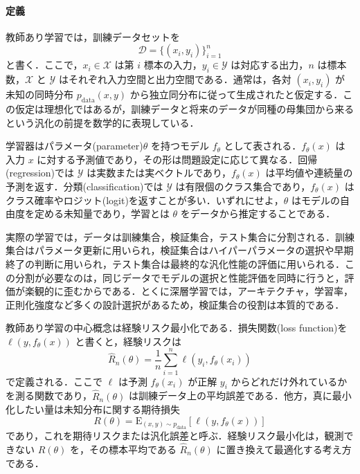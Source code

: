 \paragraph*{定義}
教師あり学習では，訓練データセットを
\begin{equation}
\mathcal D = \{(x_i,y_i)\}_{i=1}^n
\end{equation}
と書く．ここで，$x_i \in \mathcal X$ は第 $i$ 標本の入力，$y_i \in \mathcal Y$ は対応する出力，$n$ は標本数，$\mathcal X$ と $\mathcal Y$ はそれぞれ入力空間と出力空間である．通常は，各対 $(x_i,y_i)$ が未知の同時分布 $p_{\mathrm{data}}(x,y)$ から独立同分布に従って生成されたと仮定する．この仮定は理想化ではあるが，訓練データと将来のデータが同種の母集団から来るという汎化の前提を数学的に表現している．

学習器はパラメータ(parameter)$\theta$ を持つモデル $f_\theta$ として表される．$f_\theta(x)$ は入力 $x$ に対する予測値であり，その形は問題設定に応じて異なる．回帰(regression)では $\mathcal Y$ は実数または実ベクトルであり，$f_\theta(x)$ は平均値や連続量の予測を返す．分類(classification)では $\mathcal Y$ は有限個のクラス集合であり，$f_\theta(x)$ はクラス確率やロジット(logit)を返すことが多い．いずれにせよ，$\theta$ はモデルの自由度を定める未知量であり，学習とは $\theta$ をデータから推定することである．

実際の学習では，データは訓練集合，検証集合，テスト集合に分割される．訓練集合はパラメータ更新に用いられ，検証集合はハイパーパラメータの選択や早期終了の判断に用いられ，テスト集合は最終的な汎化性能の評価に用いられる．この分割が必要なのは，同じデータでモデルの選択と性能評価を同時に行うと，評価が楽観的に歪むからである．とくに深層学習では，アーキテクチャ，学習率，正則化強度など多くの設計選択があるため，検証集合の役割は本質的である．

教師あり学習の中心概念は経験リスク最小化である．損失関数(loss function)を $\ell(y,f_\theta(x))$ と書くと，経験リスクは
\begin{equation}
\hat R_n(\theta)= \frac{1}{n}\sum_{i=1}^n \ell(y_i,f_\theta(x_i))
\end{equation}
で定義される．ここで $\ell$ は予測 $f_\theta(x_i)$ が正解 $y_i$ からどれだけ外れているかを測る関数であり，$\hat R_n(\theta)$ は訓練データ上の平均誤差である．他方，真に最小化したい量は未知分布に関する期待損失
\begin{equation}
R(\theta)= \mathrm{E}_{(x,y)\sim p_{\mathrm{data}}}\left[\ell(y,f_\theta(x))\right]
\end{equation}
であり，これを期待リスクまたは汎化誤差と呼ぶ．経験リスク最小化は，観測できない $R(\theta)$ を，その標本平均である $\hat R_n(\theta)$ に置き換えて最適化する考え方である．

